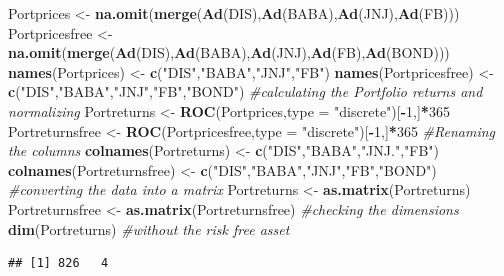 \documentclass[]{article}
\newenvironment{Shaded}{\begin{snugshade}}{\end{snugshade}}
\newcommand{\KeywordTok}[1]{\textcolor[rgb]{0.13,0.29,0.53}{\textbf{#1}}}
\newcommand{\DataTypeTok}[1]{\textcolor[rgb]{0.13,0.29,0.53}{#1}}
\newcommand{\DecValTok}[1]{\textcolor[rgb]{0.00,0.00,0.81}{#1}}
\newcommand{\StringTok}[1]{\textcolor[rgb]{0.31,0.60,0.02}{#1}}
\newcommand{\CommentTok}[1]{\textcolor[rgb]{0.56,0.35,0.01}{\textit{#1}}}
\newcommand{\OperatorTok}[1]{\textcolor[rgb]{0.81,0.36,0.00}{\textbf{#1}}}
\newcommand{\NormalTok}[1]{#1}
\begin{document}
\begin{Shaded}
\begin{Highlighting}[]
\NormalTok{Portprices <-}\StringTok{ }\KeywordTok{na.omit}\NormalTok{(}\KeywordTok{merge}\NormalTok{(}\KeywordTok{Ad}\NormalTok{(DIS),}\KeywordTok{Ad}\NormalTok{(BABA),}\KeywordTok{Ad}\NormalTok{(JNJ),}\KeywordTok{Ad}\NormalTok{(FB))) }
\NormalTok{Portpricesfree <-}\StringTok{ }\KeywordTok{na.omit}\NormalTok{(}\KeywordTok{merge}\NormalTok{(}\KeywordTok{Ad}\NormalTok{(DIS),}\KeywordTok{Ad}\NormalTok{(BABA),}\KeywordTok{Ad}\NormalTok{(JNJ),}\KeywordTok{Ad}\NormalTok{(FB),}\KeywordTok{Ad}\NormalTok{(BOND)))}
\KeywordTok{names}\NormalTok{(Portprices) <-}\StringTok{ }\KeywordTok{c}\NormalTok{(}\StringTok{"DIS"}\NormalTok{,}\StringTok{"BABA"}\NormalTok{,}\StringTok{"JNJ"}\NormalTok{,}\StringTok{"FB"}\NormalTok{)}
\KeywordTok{names}\NormalTok{(Portpricesfree) <-}\StringTok{ }\KeywordTok{c}\NormalTok{(}\StringTok{"DIS"}\NormalTok{,}\StringTok{"BABA"}\NormalTok{,}\StringTok{"JNJ"}\NormalTok{,}\StringTok{"FB"}\NormalTok{,}\StringTok{"BOND"}\NormalTok{)}
\CommentTok{#calculating the Portfolio returns and normalizing}
\NormalTok{Portreturns <-}\StringTok{ }\KeywordTok{ROC}\NormalTok{(Portprices,}\DataTypeTok{type =} \StringTok{"discrete"}\NormalTok{)[}\OperatorTok{-}\DecValTok{1}\NormalTok{,]}\OperatorTok{*}\DecValTok{365} 
\NormalTok{Portreturnsfree <-}\StringTok{ }\KeywordTok{ROC}\NormalTok{(Portpricesfree,}\DataTypeTok{type =} \StringTok{"discrete"}\NormalTok{)[}\OperatorTok{-}\DecValTok{1}\NormalTok{,]}\OperatorTok{*}\DecValTok{365}
\CommentTok{#Renaming the columns}
\KeywordTok{colnames}\NormalTok{(Portreturns) <-}\StringTok{ }\KeywordTok{c}\NormalTok{(}\StringTok{"DIS"}\NormalTok{,}\StringTok{"BABA"}\NormalTok{,}\StringTok{"JNJ."}\NormalTok{,}\StringTok{"FB"}\NormalTok{)}
\KeywordTok{colnames}\NormalTok{(Portreturnsfree) <-}\StringTok{  }\KeywordTok{c}\NormalTok{(}\StringTok{"DIS"}\NormalTok{,}\StringTok{"BABA"}\NormalTok{,}\StringTok{"JNJ"}\NormalTok{,}\StringTok{"FB"}\NormalTok{,}\StringTok{"BOND"}\NormalTok{)}
\CommentTok{#converting the data into a matrix}
\NormalTok{Portreturns <-}\StringTok{ }\KeywordTok{as.matrix}\NormalTok{(Portreturns)}
\NormalTok{Portreturnsfree <-}\StringTok{ }\KeywordTok{as.matrix}\NormalTok{(Portreturnsfree)}
\CommentTok{#checking the dimensions}
\KeywordTok{dim}\NormalTok{(Portreturns) }\CommentTok{#without the risk free asset}
\end{Highlighting}
\end{Shaded}

\begin{verbatim}
## [1] 826   4
\end{verbatim}
\end{document}
